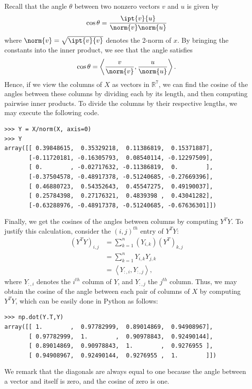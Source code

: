 Recall that the angle $\theta$ between two nonzero
vectors $v$ and $u$ is given by
\[
\cos{\theta} = \frac{\ipt{v}{u}}{\norm{v}\norm{u}}
\]
where $\norm{v} = \sqrt{\ipt{v}{v}}$ denotes the 2-norm of $x$.
By bringing the constants into the inner product, we see that the angle satisfies
\[
\cos{\theta} = \left\langle\frac{v}{\norm{v}},\frac{u}{\norm{u}}\right\rangle.
\]
Hence, if we view the columns of $X$ as vectors in $\mathbb{R}^7$, we can find the cosine of the angles between these columns by dividing each
by its length, and then computing pairwise inner products. 
To divide the columns by their respective lengths, we may execute the following code.
\begin{lstlisting}
>>> Y = X/norm(X, axis=0)
>>> Y
array([[ 0.39848615,  0.35329218,  0.11386819,  0.15371887],
       [-0.11720181, -0.16305793,  0.08540114, -0.12297509],
       [ 0.        , -0.02717632, -0.11386819,  0.        ],
       [-0.37504578, -0.48917378, -0.51240685, -0.27669396],
       [ 0.46880723,  0.54352643,  0.45547275,  0.49190037],
       [ 0.25784398,  0.27176321,  0.4839398 ,  0.43041282],
       [-0.63288976, -0.48917378, -0.51240685, -0.67636301]])
\end{lstlisting}

Finally, we get the cosines of the angles between columns by computing $Y^T Y$. To justify this calculation, consider
the $(i,j)^{th}$ entry of $Y^T Y$:
\begin{align*}
(Y^T Y)_{i,j} &= \sum_{k=1}^n (Y_{i,k})(Y^T)_{k,j} \\
&= \sum_{k=1}^n Y_{i,k}Y_{j,k} \\
&= \left\langle Y_{:,i}, Y_{:,j} \right\rangle,
\end{align*}
where $Y_{:,i}$ denotes the $i^{th}$ column of $Y$, and $Y_{:,j}$ the $j^{th}$ column.
Thus, we may obtain the cosine of the angle between each pair of columns of $X$ by computing $Y^T Y$,
which can be easily done in Python as follows:
\begin{lstlisting}
>>> np.dot(Y.T,Y)
array([[ 1.        ,  0.97782999,  0.89014869,  0.94908967],
       [ 0.97782999,  1.        ,  0.90978843,  0.92490144],
       [ 0.89014869,  0.90978843,  1.        ,  0.9276955 ],
       [ 0.94908967,  0.92490144,  0.9276955 ,  1.        ]])
\end{lstlisting}

We remark that the diagonals are always equal to one because the angle between a vector and itself is zero, and the cosine of zero is one.


